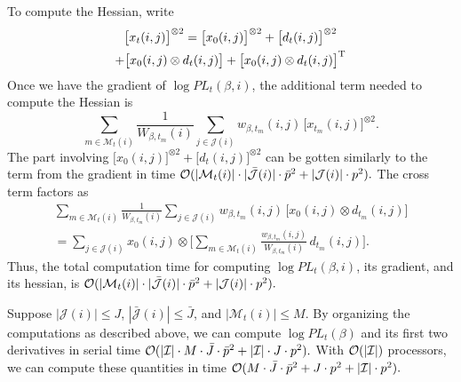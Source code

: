 \documentclass[aoas,preprint]{imsart}
\begin{document}
To compute the Hessian, write
\begin{multline*}
    \big[ x_t(i,j) \big]^{\otimes 2}
    =
    \big[ x_0(i,j) \big]^{\otimes 2}
    +
    \big[ d_t(i,j) \big]^{\otimes 2} \\
    + 
    \big[
        x_0(i,j) \otimes d_t(i,j)
    \big]
    +
    \big[
        x_0(i,j) \otimes d_t(i,j)
    \big]^\trans
\end{multline*}
Once we have the gradient of $\log \mathit{PL}_t(\beta,i)$,
the additional term needed to compute the Hessian is
\[
    \sum_{m \in \mathcal{M}_t(i)}
        \frac{1}{W_{\beta,t_m}\!(i)}
        \sum_{j \in \mathcal{J}(i)}
            w_{\beta,t_m}\!(i,j) \,
            \big[
                x_{t_m}\!(i,j)
            \big]^{\otimes 2}.
\]
The part involving
$\big[ x_0(i,j) \big]^{\otimes 2} + \big[ d_t(i,j) \big]^{\otimes 2}$
can be gotten similarly to the term from the gradient in time
\(
    \mathcal{O}(
        |\mathcal{M}_t(i)| \cdot |\mathcal{\bar J}(i)| \cdot \bar p^2
        +
        |\mathcal{J}(i)| \cdot p^2
    ).
\)
The cross term factors as
\begin{multline*}
    \sum_{m \in \mathcal{M}_t(i)}
        \frac{1}{W_{\beta,t_m}\!(i)}
        \sum_{j \in \mathcal{J}(i)}
            w_{\beta,t_m}\!(i,j) \,
            \big[
                x_{0}(i,j)
                \otimes
                d_{t_m}\!(i,j)
            \big] \\
        =
        \sum_{j \in \mathcal{J}(i)}
            x_{0}(i,j)
            \otimes
            \bigg[
                \sum_{m \in \mathcal{M}_t(i)}
                    \frac{w_{\beta,t_m}\!(i,j)}{W_{\beta,t_m}\!(i)}
                    \,
                    d_{t_m}\!(i,j)
            \bigg].
\end{multline*}
Thus, the total computation time for computing $\log \mathit{PL}_t(\beta,i)$,
its gradient, and its hessian, is
\(
    \mathcal{O}(
        |\mathcal{M}_t(i)| \cdot |\mathcal{\bar J}(i)| \cdot \bar p^2
        +
        |\mathcal{J}(i)| \cdot p^2
    ).
\)

Suppose $|\mathcal{J}(i)| \leq J$, $|\mathcal{\bar J}(i)| \leq \bar J$,
and $|\mathcal{M}_t(i)| \leq M$.  By organizing the computations as described
above, we can compute $\log \mathit{PL}_t(\beta)$ and its first
two derivatives in serial time
\(
    \mathcal{O}(
        | \mathcal{I} |
        \cdot
        M
        \cdot
        \bar J
        \cdot
        \bar p^2
        +
        |\mathcal{I}| \cdot J \cdot p^2
    ).
\)
With $\mathcal{O}(|\mathcal{I}|)$ processors, we can compute these quantities in time
\(
    \mathcal{O}(
        M \cdot \bar J \cdot \bar p^2
        +
        J \cdot p^2
        +
        |\mathcal{I}| \cdot p^2
    ).
\)
\end{document}

